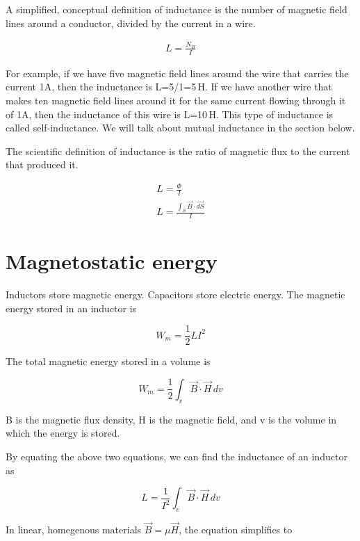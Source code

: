 \documentclass{ximera}
\begin{document}
 A simplified, conceptual definition of inductance is the number of magnetic field lines around a conductor, divided by the current in a wire.
 
 \begin{eqnarray}
 L=\frac{N_B}{I}
 \end{eqnarray}
 
 For example, if we have five magnetic field lines around the wire that carries the current 1A, then the inductance is L=5/1=5\,H. If we have another wire that makes ten magnetic field lines around it for the same current flowing through it of 1A, then the inductance of this wire is L=10\,H. This type of inductance is called self-inductance. We will talk about mutual inductance in the section below.

The scientific definition of inductance is the ratio of magnetic flux to the current that produced it.

\begin{eqnarray}
L=\frac{\Phi}{I} \\
L=\frac{\int_S \vec{B} \cdot \vec{dS}}{I}
\end{eqnarray}

\section{Magnetostatic energy}

Inductors store magnetic energy. Capacitors store electric energy. The magnetic energy stored in an inductor is

\begin{equation}
W_m=\frac{1}{2} L I^2
\end{equation}

The total magnetic energy stored in a volume is

\begin{equation}
W_m=\frac{1}{2}\int_v \vec{B} \cdot \vec{H} \, dv 
\end{equation}

B is the magnetic flux density, H is the magnetic field, and v is the volume in which the energy is stored. 

By equating the above two equations, we can find the inductance of an inductor as

\begin{equation}
L=\frac{1}{I^2} \int_v \vec{B} \cdot \vec{H} \,dv 
\end{equation}

In linear, homegenous materials $\vec{B} = \mu \vec{H}$, the equation simplifies to
\end{document}
